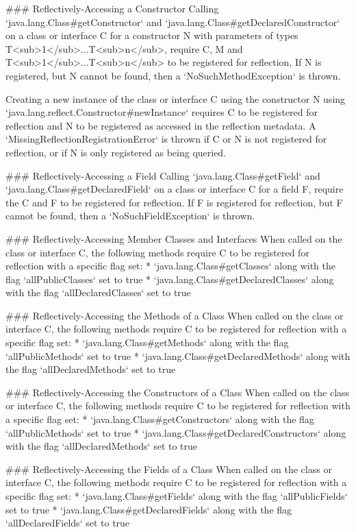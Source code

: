 ### Reflectively-Accessing a Constructor
Calling `java.lang.Class#getConstructor` and `java.lang.Class#getDeclaredConstructor` on a class or interface C 
for a constructor N with parameters of types T<sub>1</sub>...T<sub>n</sub>, require C, M and T<sub>1</sub>...T<sub>n</sub>
to be registered for reflection,
If N is registered, but N cannot be found, then a `NoSuchMethodException` is thrown.

Creating a new instance of the class or interface C using the constructor N using
`java.lang.reflect.Constructor#newInstance` requires C to be registered for reflection
and N to be registered as accessed in the reflection metadata.
A `MissingReflectionRegistrationError` is thrown if C or N is not registered for reflection, or
if N is only registered as being queried.

### Reflectively-Accessing a Field
Calling `java.lang.Class#getField` and `java.lang.Class#getDeclaredField` on a class or interface C for a field F,
require the C and F to be registered for reflection.
If F is registered for reflection, but F cannot be found, then a `NoSuchFieldException` is thrown.

### Reflectively-Accessing Member Classes and Interfaces
When called on the class or interface C, the following methods require C to be registered for reflection with
a specific flag set:
* `java.lang.Class#getClasses` along with the flag `allPublicClasses` set to true
* `java.lang.Class#getDeclaredClasses` along with the flag `allDeclaredClasses` set to true

### Reflectively-Accessing the Methods of a Class
When called on the class or interface C, the following methods require C to be registered for reflection with 
a specific flag set:
* `java.lang.Class#getMethods` along with the flag `allPublicMethods` set to true
* `java.lang.Class#getDeclaredMethods` along with the flag `allDeclaredMethods` set to true

### Reflectively-Accessing the Constructors of a Class
When called on the class or interface C, the following methods require C to be registered for reflection with
a specific flag set:
* `java.lang.Class#getConstructors` along with the flag `allPublicMethods` set to true
* `java.lang.Class#getDeclaredConstructors` along with the flag `allDeclaredMethods` set to true

### Reflectively-Accessing the Fields of a Class
When called on the class or interface C, the following methods require C to be registered for reflection with
a specific flag set:
* `java.lang.Class#getFields` along with the flag `allPublicFields` set to true
* `java.lang.Class#getDeclaredFields` along with the flag `allDeclaredFields` set to true

